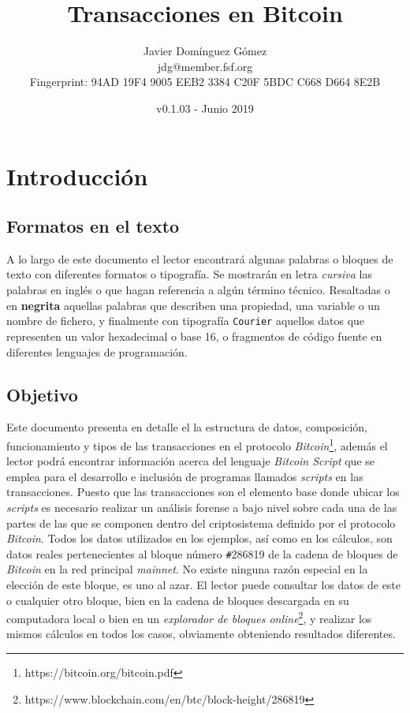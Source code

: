 \documentclass{article}
\title{\textbf{Transacciones en Bitcoin}}
\author{Javier Domínguez Gómez \\
\small{jdg@member.fsf.org} \\
\small{Fingerprint: 94AD 19F4 9005 EEB2 3384 C20F 5BDC C668 D664 8E2B}}
\date{v0.1.03 - Junio 2019}
\begin{document}
\maketitle

\tableofcontents{}

\vspace{19mm}

\section{Introducción}
    \subsection{Formatos en el texto}
    A lo largo de este documento el lector encontrará algunas palabras o bloques de texto con diferentes formatos o tipografía. Se mostrarán en letra \textit{cursiva} las palabras en inglés o que hagan referencia a algún término técnico. Resaltadas o en \textbf{negrita} aquellas palabras que describen una propiedad, una variable o un nombre de fichero, y finalmente con tipografía \texttt{Courier} aquellos datos que representen un valor hexadecimal o base 16, o fragmentos de código fuente en diferentes lenguajes de programación.
    
    \subsection{Objetivo}
    Este documento presenta en detalle el la estructura de datos, composición, funcionamiento y tipos de las transacciones en el protocolo \textit{Bitcoin}\footnote{https://bitcoin.org/bitcoin.pdf}, además el lector podrá encontrar información acerca del lenguaje \textit{Bitcoin Script} que se emplea para el desarrollo e inclusión de programas llamados \textit{scripts} en las transacciones. Puesto que las transacciones son el elemento base donde ubicar los \textit{scripts} es necesario realizar un análisis forense a bajo nivel sobre cada una de las partes de las que se componen dentro del criptosistema definido por el protocolo \textit{Bitcoin}. Todos los datos utilizados en los ejemplos, así como en los cálculos, son datos reales pertenecientes al bloque número \texttt{\#}286819 de la cadena de bloques de \textit{Bitcoin} en la red principal \textit{mainnet}. No existe ninguna razón especial en la elección de este bloque, es uno al azar. El lector puede consultar los datos de este o cualquier otro bloque, bien en la cadena de bloques descargada en su computadora local o bien en un \textit{explorador de bloques online}\footnote{https://www.blockchain.com/en/btc/block-height/286819}, y realizar los mismos cálculos en todos los casos, obviamente obteniendo resultados diferentes.
    
\end{document}
